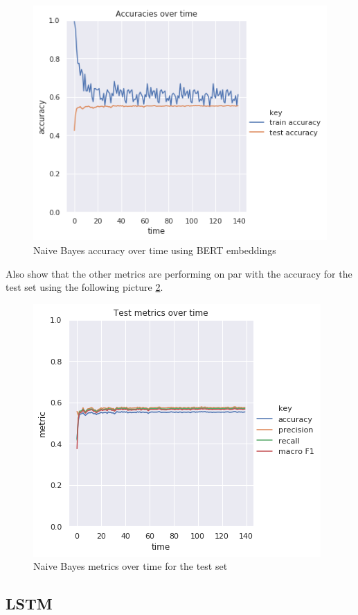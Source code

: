 \documentclass[12pt]{extreport}
\begin{document}
\begin{figure}[ht!]
\centering
\includegraphics[width=0.8\linewidth]{assets/framework/nb_BERT_accuracy_holdout.png}
\caption{Naive Bayes accuracy over time using BERT embeddings}
\label{fig:nb-acc}
\end{figure}

Also show that the other metrics are performing on par with the accuracy for the test set using the following picture \ref{fig:nb-metrics}.

\begin{figure}[H]
\centering
\includegraphics[width=0.8\linewidth]{assets/framework/nb_BERT_test_metrics_holdout.png}
\caption{Naive Bayes metrics over time for the test set}
\label{fig:nb-metrics}
\end{figure}

\subsection{LSTM}
\end{document}
